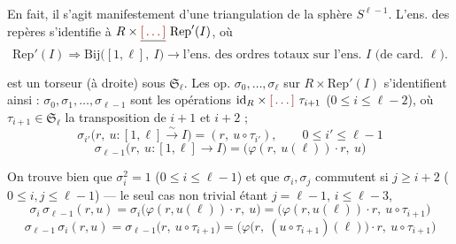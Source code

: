 \documentclass[11pt,a4paper]{article}
\begin{document}

En fait, il s'agit manifestement d'une triangulation de la sphère
$S^{\ell-1}$. L'ens. des repères s'identifie à
$R \times \struck{\ill{}}\ \mathrm{Rep}'(I)$, où
\[
  \mathrm{Rep}'(I) \Longrightarrow \mathrm{Bij}\bigl([1,\ell],\ I\bigr)
  \longrightarrow \text{l'ens. des ordres totaux sur l'ens. } I
  \text{ (de card. } \ell) .
\]


\ill{} est un torseur (à droite) sous $\mathfrak{S}_\ell$. Les op.
$\sigma_0, \ldots, \sigma_\ell$ sur $R \times \mathrm{Rep}'(I)$ s'identifient
\ill{} ainsi : $\sigma_0, \sigma_1, \ldots, \sigma_{\ell-1}$ sont les
opérations $\mathrm{id}_R \times \ill{}\ \tau_{i+1}$
($0 \leqslant i \leqslant \ell-2$), où $\tau_{i+1} \in \mathfrak{S}_\ell$
\ill{} la transposition de $i+1$ et $i+2$ ;
\[
  \sigma_{i'}\bigl(r,\ u : [1,\ell] \overset{\sim}{\to} I\bigr)
  = (r,\ u \circ \tau_{i'}),
  \qquad 0 \leqslant i' \leqslant \ell-1
\]
\[
  \sigma_{\ell-1}\bigl(r,\ u : [1,\ell] \longrightarrow I\bigr)
  = \bigl(\varphi(r,\ u(\ell))\cdot r,\ u\bigr)
\]

On trouve bien que $\sigma_i^2 = 1$ ($0 \leqslant i \leqslant \ell-1$) et que
$\sigma_i, \sigma_j$ commutent si $j \geqslant i+2$
($0 \leqslant i, j \leqslant \ell-1$) — le seul cas non trivial étant
$j = \ell-1$, $i \leqslant \ell-3$,
\[
  \sigma_i\,\sigma_{\ell-1}(r,u)
  = \sigma_i\bigl(\varphi(r,u(\ell))\cdot r,\ u\bigr)
  = \bigl(\varphi(r,u(\ell))\cdot r,\ u \circ \tau_{i+1}\bigr)
\]
\[
  \sigma_{\ell-1}\,\sigma_i(r,u)
  = \sigma_{\ell-1}\bigl(r,\ u \circ \tau_{i+1}\bigr)
  = \bigl(\varphi\bigl(r,\ (u \circ \tau_{i+1})(\ell)\bigr)\cdot r,\
    u \circ \tau_{i+1}\bigr)
\]
\end{document}
